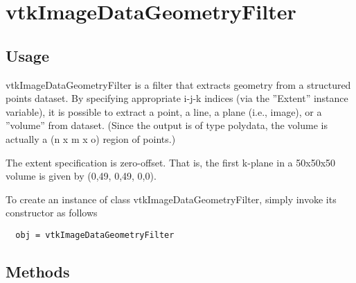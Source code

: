\section{vtkImageDataGeometryFilter}

\subsection{Usage}

 vtkImageDataGeometryFilter is a filter that extracts geometry from a
 structured points dataset. By specifying appropriate i-j-k indices (via the 
 ''Extent'' instance variable), it is possible to extract a point, a line, a 
 plane (i.e., image), or a ''volume'' from dataset. (Since the output is 
 of type polydata, the volume is actually a (n x m x o) region of points.)

 The extent specification is zero-offset. That is, the first k-plane in
 a 50x50x50 volume is given by (0,49, 0,49, 0,0).

To create an instance of class vtkImageDataGeometryFilter, simply
invoke its constructor as follows
\begin{verbatim}
  obj = vtkImageDataGeometryFilter
\end{verbatim}
\subsection{Methods}


